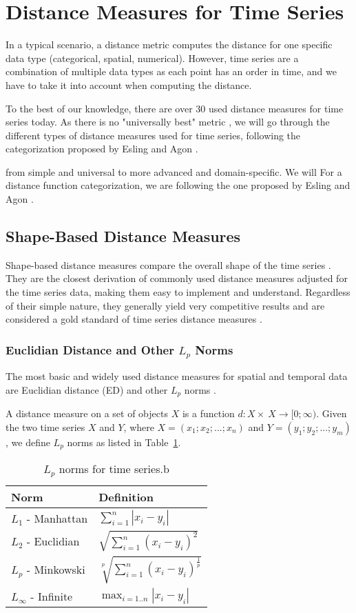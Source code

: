 \section{Distance Measures for Time Series}
In a typical scenario, a distance metric computes the distance for one specific data type (categorical, spatial, numerical). However, time series are a combination of multiple data types as each point has an order in time, and we have to take it into account when computing the distance.

To the best of our knowledge, there are over 30 used distance measures for time series today. As there is no "universally best" metric \cite{met:universal}, we will go through the different types of distance measures used for time series, following the categorization proposed by Esling and Agon \cite{met:classification}.

from simple and universal to more advanced and domain-specific. We will For a distance function categorization, we are following the one proposed by Esling and Agon \cite{met:classification}.

\subsection{Shape-Based Distance Measures}
Shape-based distance measures compare the overall shape of the time series \cite{met:classification}. They are the closest derivation of commonly used distance measures adjusted for the time series data, making them easy to implement and understand. Regardless of their simple nature, they generally yield very competitive results and are considered a gold standard of time series distance measures \cite{met:comparison-new, met:dtw-best-0, met:dtw-best-1, met:universal, met:fDTW}.

\subsubsection{Euclidian Distance and Other $L_p$ Norms}
The most basic and widely used distance measures for spatial and temporal data are Euclidian distance (ED) and other $L_p$ norms \cite{met:lp-norm, met:lp-norm-usage}.

A distance measure on a set of objects $X$ is a function $d:X\times~X\rightarrow[0; \infty)$.
Given the two time series $X$ and $Y$, where $X=(x_1; x_2; ...; x_n)$ and $Y=(y_1; y_2;...; y_m)$, we define $L_p$ norms as listed in Table~\ref{tab:lp-norms}.
\begin{table}[!htbp]
\begin{tabular}{ll}
\textbf{Norm}          & \textbf{Definition}                               \\ \hline
$L_1$ - Manhattan      & $\sum^{n}_{i=1}|x_i - y_i|$                       \\
$L_2$ - Euclidian      & $\sqrt{\sum^{n}_{i=1}(x_i - y_i)^2}$              \\
$L_p$ - Minkowski      & $\sqrt[p]{\sum^{n}_{i=1}(x_i - y_i)^\frac{1}{p}}$ \\
$L_\infty$ - Infinite  & $\max_{i=1..n}|x_i - y_i|$
\end{tabular}
\caption{$L_p$ norms for time series.b}
\label{tab:lp-norms}
\end{table}

